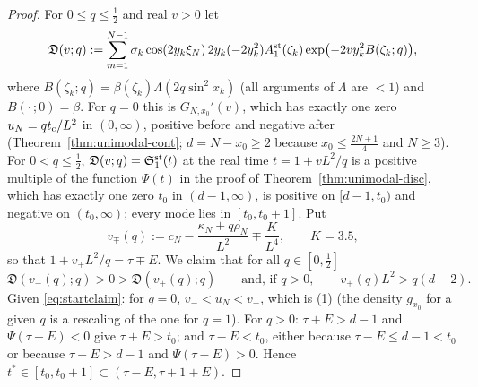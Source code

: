 \documentclass[11pt,a4paper]{article}
\theoremstyle{definition}
\theoremstyle{remark}
\newcommand{\fD}{\mathfrak{D}}
\begin{document}
\begin{proof}
For $0\le q\le\frac12$ and real $v>0$ let
\[
  \fD(v;q):=\sum_{m=1}^{N-1}\sigma_k\cos(2y_k\xi_N)\,2y_k(-2y_k^2)A^{\rm st}_1(\zeta_k)\exp\bigl(-2vy_k^2B(\zeta_k;q)\bigr),
\]
where $B(\zeta_k;q)=\beta(\zeta_k)\Lambda(2q\sin^2x_k)$ (all arguments of $\Lambda$ are $<1$) and $B(\cdot\,;0)=\beta$. For $q=0$
this is $G_{N,x_0}'(v)$, which has exactly one zero $u_N=qt_{\rm c}/L^2$ in $(0,\infty)$, positive before and negative
after (Theorem~\ref{thm:unimodal-cont}; $d=N-x_0\ge2$ because $x_0\le\frac{2N+1}4$ and $N\ge3$). For $0<q\le\frac12$,
$\fD(v;q)=\mathfrak S^{\rm st}_1(t)$ at the real time $t=1+vL^2/q$ is a positive multiple of the function $\Psi(t)$ in the
proof of Theorem~\ref{thm:unimodal-disc}, which has exactly one zero $t_0$ in $(d-1,\infty)$, is positive on
$[d-1,t_0)$ and negative on $(t_0,\infty)$; every mode lies in $[t_0,t_0+1]$. Put
\[
   v_\mp(q):=c_N-\frac{\kappa_N+q\rho_N}{L^2}\mp\frac{K}{L^4},\qquad K=3.5 ,
\]
so that $1+v_\mp L^2/q=\tau\mp E$. We claim that for all $q\in[0,\frac12]$
\begin{equation}\label{eq:startclaim}
   \fD(v_-(q);q)>0>\fD(v_+(q);q)\qquad\text{and, if }q>0,\qquad v_+(q)L^2>q(d-2).
\end{equation}
Given \eqref{eq:startclaim}: for $q=0$, $v_-<u_N<v_+$, which is (1) (the density $g_{x_0}$ for a given $q$ is a rescaling of
the one for $q=1$). For $q>0$: $\tau+E>d-1$ and $\Psi(\tau+E)<0$ give $\tau+E>t_0$; and $\tau-E<t_0$, either because
$\tau-E\le d-1<t_0$ or because $\tau-E>d-1$ and $\Psi(\tau-E)>0$. Hence $t^*\in[t_0,t_0+1]\subset(\tau-E,\tau+1+E)$.


\end{proof}
\end{document}
